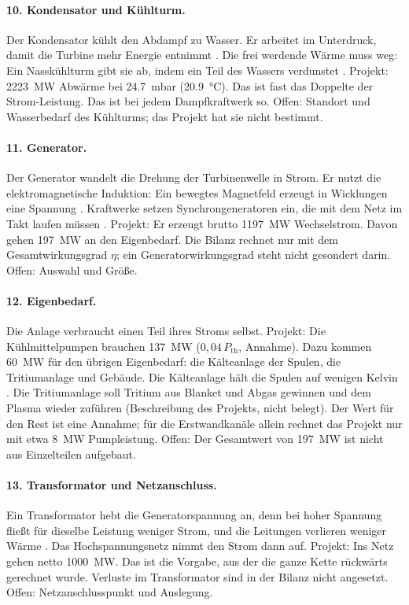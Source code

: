 \paragraph{10. Kondensator und Kühlturm.} Der Kondensator kühlt den Abdampf zu Wasser. Er arbeitet im Unterdruck, damit die Turbine mehr Energie entnimmt \cite{bt_condenser}. Die frei werdende Wärme muss weg: Ein Nasskühlturm gibt sie ab, indem ein Teil des Wassers verdunstet \cite{bt_cooling}. Projekt: \SI{2223}{MW} Abwärme bei \SI{24,7}{mbar} (\SI{20,9}{\celsius}). Das ist fast das Doppelte der Strom-Leistung. Das ist bei jedem Dampfkraftwerk so. Offen: Standort und Wasserbedarf des Kühlturms; das Projekt hat sie nicht bestimmt.

\paragraph{11. Generator.} Der Generator wandelt die Drehung der Turbinenwelle in Strom. Er nutzt die elektromagnetische Induktion: Ein bewegtes Magnetfeld erzeugt in Wicklungen eine Spannung \cite{bt_generator}. Kraftwerke setzen Synchrongeneratoren ein, die mit dem Netz im Takt laufen müssen \cite{bt_generator,bt_turbine}. Projekt: Er erzeugt brutto \SI{1197}{MW} Wechselstrom. Davon gehen \SI{197}{MW} an den Eigenbedarf. Die Bilanz rechnet nur mit dem Gesamtwirkungsgrad $\eta$; ein Generatorwirkungsgrad steht nicht gesondert darin. Offen: Auswahl und Größe.

\paragraph{12. Eigenbedarf.} Die Anlage verbraucht einen Teil ihres Stroms selbst. Projekt: Die Kühlmittelpumpen brauchen \SI{137}{MW} ($0{,}04\,P_\text{th}$, Annahme). Dazu kommen \SI{60}{MW} für den übrigen Eigenbedarf: die Kälteanlage der Spulen, die Tritiumanlage und Gebäude. Die Kälteanlage hält die Spulen auf wenigen Kelvin \cite{bt_w7x_en}. Die Tritiumanlage soll Tritium aus Blanket und Abgas gewinnen und dem Plasma wieder zuführen (Beschreibung des Projekts, nicht belegt). Der Wert für den Rest ist eine Annahme; für die Erstwandkanäle allein rechnet das Projekt nur mit etwa \SI{8}{MW} Pumpleistung. Offen: Der Gesamtwert von \SI{197}{MW} ist nicht aus Einzelteilen aufgebaut.

\paragraph{13. Transformator und Netzanschluss.} Ein Transformator hebt die Generatorspannung an, denn bei hoher Spannung fließt für dieselbe Leistung weniger Strom, und die Leitungen verlieren weniger Wärme \cite{bt_transformer}. Das Hochspannungsnetz nimmt den Strom dann auf. Projekt: Ins Netz gehen netto \SI{1000}{MW}. Das ist die Vorgabe, aus der die ganze Kette rückwärts gerechnet wurde. Verluste im Transformator sind in der Bilanz nicht angesetzt. Offen: Netzanschlusspunkt und Auslegung.
